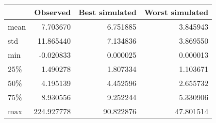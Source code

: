\begin{tabular}{lrrr}
\toprule
{} &    Observed &  Best simulated &  Worst simulated \\
\midrule
mean &    7.703670 &        6.751885 &         3.845943 \\
std  &   11.865440 &        7.134836 &         3.869550 \\
min  &   -0.020833 &        0.000025 &         0.000013 \\
25\%  &    1.490278 &        1.807334 &         1.103671 \\
50\%  &    4.195139 &        4.452596 &         2.655732 \\
75\%  &    8.930556 &        9.252244 &         5.330906 \\
max  &  224.927778 &       90.822876 &        47.801514 \\
\bottomrule
\end{tabular}
